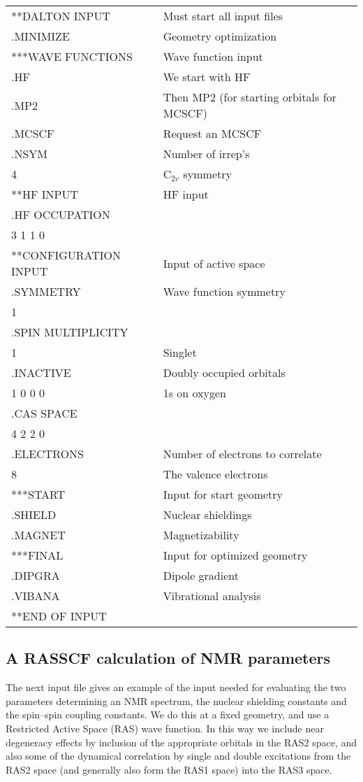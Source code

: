 {\ttfamily
\begin{tabular}{ll}
**DALTON INPUT\hspace{4cm} & Must start all input files\\
.MINIMIZE & Geometry optimization\\
***WAVE FUNCTIONS & Wave function input\\
.HF & We start with HF\\
.MP2 & Then MP2 (for starting orbitals for MCSCF)\\
.MCSCF & Request an MCSCF\\
.NSYM & Number of irrep's\\
 4 & C$_{2v}$ symmetry\\
**HF INPUT & HF input\\
.HF OCCUPATION\\
 3 1 1 0\\
**CONFIGURATION INPUT & Input of active space\\
.SYMMETRY & Wave function symmetry\\
 1\\
.SPIN MULTIPLICITY\\
 1 & Singlet\\
.INACTIVE & Doubly occupied orbitals\\
 1 0 0 0 & 1s on oxygen\\
.CAS SPACE\\
 4 2 2 0\\
.ELECTRONS & Number of electrons to correlate\\
 8 & The valence electrons\\
***START & Input for start geometry\\
.SHIELD & Nuclear shieldings\\
.MAGNET & Magnetizability\\
***FINAL & Input for optimized geometry\\
.DIPGRA & Dipole gradient\\
.VIBANA & Vibrational analysis\\
**END OF INPUT\\
\end{tabular}}

\subsection{A RASSCF calculation of NMR parameters}

The next input file gives an example of the input needed for
evaluating the two parameters determining an NMR spectrum, the nuclear
shielding constants and the spin--spin
coupling constants. We do this
at a fixed geometry, and use a Restricted Active Space (RAS) wave
function. In this way we include near degeneracy effects by inclusion
of the appropriate orbitals in the RAS2 space, and also some of the
dynamical correlation  by single and
double excitations
from the RAS2 space (and generally also form the RAS1 space) into the
RAS3 space.


